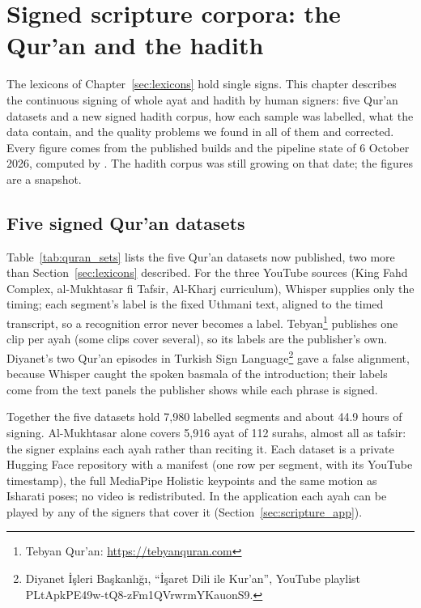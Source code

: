 \chapter{Signed scripture corpora: the Qur'an and the hadith}
\label{sec:scripture}

The lexicons of Chapter~\ref{sec:lexicons} hold single signs. This chapter describes the continuous signing of whole
ayat and hadith by human signers: five Qur'an datasets and a new signed hadith corpus, how each sample was labelled,
what the data contain, and the quality problems we found in all of them and corrected. Every figure comes from the
published builds and the pipeline state of 6 October 2026, computed by . The
hadith corpus was still growing on that date; the figures are a snapshot.

\section{Five signed Qur'an datasets}
\label{sec:quran_sets}

Table~\ref{tab:quran_sets} lists the five Qur'an datasets now published, two more than Section~\ref{sec:lexicons}
described. For the three YouTube sources (King Fahd Complex, al-Mukhtasar fi Tafsir, Al-Kharj curriculum), Whisper
\cite{whisper} supplies only the timing; each segment's label is the fixed Uthmani text, aligned to the timed
transcript, so a recognition error never becomes a label. Tebyan\footnote{Tebyan Qur'an: \url{https://tebyanquran.com}}
publishes one clip per ayah (some clips cover several), so its labels are the publisher's own. Diyanet's two Qur'an
episodes in Turkish Sign Language\footnote{Diyanet \.{I}\c{s}leri Ba\c{s}kanl\i\u{g}\i, ``\.{I}\c{s}aret Dili ile
Kur'an'', YouTube playlist PLtApkPE49w-tQ8-zFm1QVrwrmYKauonS9.} gave a false alignment, because Whisper caught the
spoken basmala of the introduction; their labels come from the text panels the publisher shows while each phrase is
signed.



Together the five datasets hold 7,980 labelled segments and about 44.9 hours of signing. Al-Mukhtasar alone covers 5,916
ayat of 112 surahs, almost all as tafsir: the signer explains each ayah rather than reciting it. Each dataset is a
private Hugging Face repository with a manifest (one row per segment, with its YouTube timestamp), the full MediaPipe
Holistic keypoints and the same motion as Isharati poses; no video is redistributed. In the application each ayah can
be played by any of the signers that cover it (Section~\ref{sec:scripture_app}).

